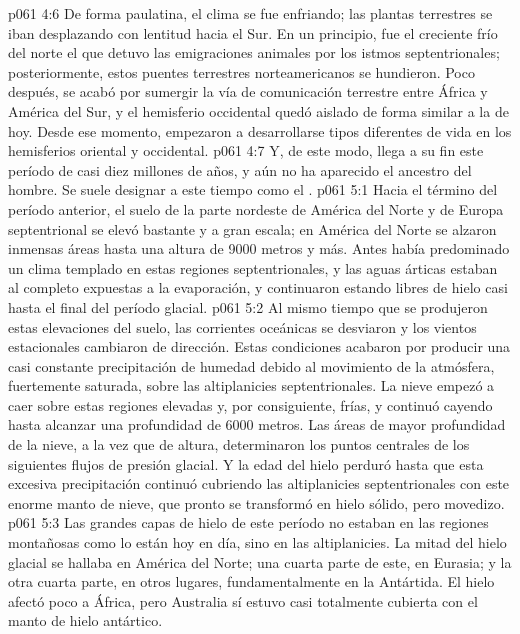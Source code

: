 \vs p061 4:6 De forma paulatina, el clima se fue enfriando; las plantas terrestres se iban desplazando con lentitud hacia el Sur. En un principio, fue el creciente frío del norte el que detuvo las emigraciones animales por los istmos septentrionales; posteriormente, estos puentes terrestres norteamericanos se hundieron. Poco después, se acabó por sumergir la vía de comunicación terrestre entre África y América del Sur, y el hemisferio occidental quedó aislado de forma similar a la de hoy. Desde ese momento, empezaron a desarrollarse tipos diferentes de vida en los hemisferios oriental y occidental.
\vs p061 4:7 \pc Y, de este modo, llega a su fin este período de casi diez millones de años, y aún no ha aparecido el ancestro del hombre. Se suele designar a este tiempo como el .
\vs p061 5:1 Hacia el término del período anterior, el suelo de la parte nordeste de América del Norte y de Europa septentrional se elevó bastante y a gran escala; en América del Norte se alzaron inmensas áreas hasta una altura de 9000 metros y más. Antes había predominado un clima templado en estas regiones septentrionales, y las aguas árticas estaban al completo expuestas a la evaporación, y continuaron estando libres de hielo casi hasta el final del período glacial.
\vs p061 5:2 Al mismo tiempo que se produjeron estas elevaciones del suelo, las corrientes oceánicas se desviaron y los vientos estacionales cambiaron de dirección. Estas condiciones acabaron por producir una casi constante precipitación de humedad debido al movimiento de la atmósfera, fuertemente saturada, sobre las altiplanicies septentrionales. La nieve empezó a caer sobre estas regiones elevadas y, por consiguiente, frías, y continuó cayendo hasta alcanzar una profundidad de 6000 metros. Las áreas de mayor profundidad de la nieve, a la vez que de altura, determinaron los puntos centrales de los siguientes flujos de presión glacial. Y la edad del hielo perduró hasta que esta excesiva precipitación continuó cubriendo las altiplanicies septentrionales con este enorme manto de nieve, que pronto se transformó en hielo sólido, pero movedizo.
\vs p061 5:3 Las grandes capas de hielo de este período no estaban en las regiones montañosas como lo están hoy en día, sino en las altiplanicies. La mitad del hielo glacial se hallaba en América del Norte; una cuarta parte de este, en Eurasia; y la otra cuarta parte, en otros lugares, fundamentalmente en la Antártida. El hielo afectó poco a África, pero Australia sí estuvo casi totalmente cubierta con el manto de hielo antártico.
